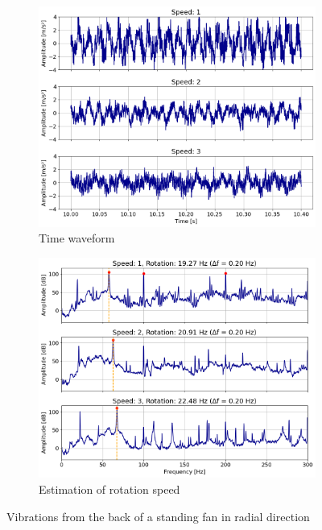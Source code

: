 \begin{figure}[h]
    \centering
    \begin{subfigure}[b]{0.49\textwidth}
        \includegraphics[width=\textwidth]{assets/results/standing-fan/waveform.png}
        \caption{Time waveform}
    \end{subfigure}
    \hfill
    \begin{subfigure}[b]{0.49\textwidth}
        \includegraphics[width=\textwidth]{assets/results/standing-fan/standing-fan-accel.png}
        \caption{Estimation of rotation speed}
    \end{subfigure}
    \caption{Vibrations from the back of a standing fan in radial direction}
\end{figure}


